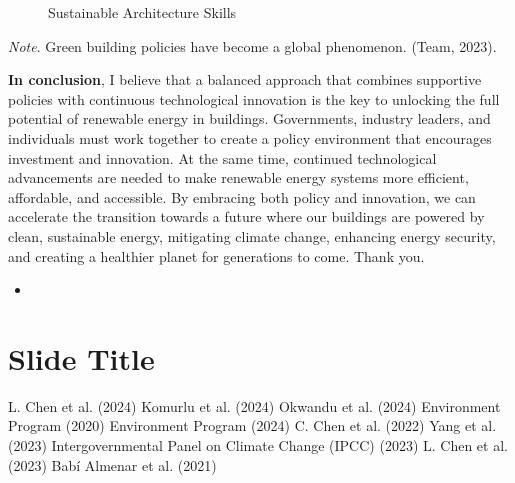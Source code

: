 \documentclass[
  letterpaper,
  DIV=11,
  numbers=noendperiod]{scrartcl}
\providecommand{\tightlist}{%
  \setlength{\itemsep}{0pt}\setlength{\parskip}{0pt}}\usepackage{longtable,booktabs,array}
\begin{document}
\begin{figure}


\caption{\label{fig-solutions}Sustainable Architecture Skills}

\end{figure}%

\emph{Note}. Green building policies have become a global phenomenon.
(Team, 2023).

\textbf{In conclusion}, I believe that a balanced approach that combines
supportive policies with continuous technological innovation is the key
to unlocking the full potential of renewable energy in buildings.
Governments, industry leaders, and individuals must work together to
create a policy environment that encourages investment and innovation.
At the same time, continued technological advancements are needed to
make renewable energy systems more efficient, affordable, and
accessible. By embracing both policy and innovation, we can accelerate
the transition towards a future where our buildings are powered by
clean, sustainable energy, mitigating climate change, enhancing energy
security, and creating a healthier planet for generations to come. Thank
you.

\begin{itemize}
\tightlist
\item
\end{itemize}

\section{Slide Title}\label{slide-title}

L. Chen et al. (2024) Komurlu et al. (2024) Okwandu et al. (2024)
Environment Program (2020) Environment Program (2024) C. Chen et al.
(2022) Yang et al. (2023) Intergovernmental Panel on Climate Change
(IPCC) (2023) L. Chen et al. (2023) Babí Almenar et al. (2021)
\end{document}
